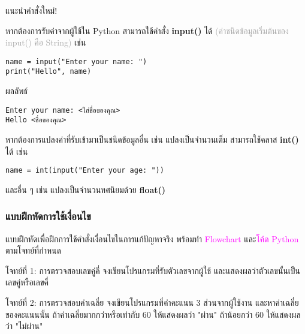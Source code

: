 \documentclass[12pt,a4paper]{article}
\newcommand{\textlight}[1]{{\thailightfont #1}}
\begin{document}
\begin{noticebox}{แนะนำคำสั่งใหม่!}

\textlight{หากต้องการรับค่าจากผู้ใช้ใน Python สามารถใช้คำสั่ง \textbf{input()} ได้ \textcolor{darkgray}{(ค่าชนิดข้อมูลเริ่มต้นของ input() คือ String)} เช่น}

\begin{codebox}{}
\begin{lstlisting}[style=python]
name = input("Enter your name: ")
print("Hello", name)
\end{lstlisting}
\end{codebox}

\begin{resultbox}{ผลลัพธ์}
\begin{verbatim}
Enter your name: <ใส่ชื่อของคุณ>
Hello <ชื่อของคุณ>
\end{verbatim}
\end{resultbox}

\textlight{หากต้องการแปลงค่าที่รับเข้ามาเป็นชนิดข้อมูลอื่น เช่น แปลงเป็นจำนวนเต็ม สามารถใช้คลาส \textbf{int()} ได้ เช่น}

\begin{codebox}{}
\begin{lstlisting}[style=python]
name = int(input("Enter your age: "))
\end{lstlisting}
\end{codebox}

\textlight{และอื่น ๆ เช่น แปลงเป็นจำนวนทศนิยมด้วย \textbf{float()}}

\end{noticebox}

\subsubsection{แบบฝึกหัดการใช้เงื่อนไข}

\textlight{แบบฝึกหัดเพื่อฝึกการใช้คำสั่งเงื่อนไขในการแก้ปัญหาจริง พร้อมทำ \textcolor{magenta}{Flowchart} และ\textcolor{magenta}{โค้ด Python} ตามโจทย์ที่กำหนด}

\begin{exercisebox}{โจทย์ที่ 1: การตรวจสอบเลขคู่คี่}
\textlight{จงเขียนโปรแกรมที่รับตัวเลขจากผู้ใช้ และแสดงผลว่าตัวเลขนั้นเป็นเลขคู่หรือเลขคี่}
\end{exercisebox}

\begin{exercisebox}{โจทย์ที่ 2: การตรวจสอบค่าเฉลี่ย}
\textlight{จงเขียนโปรแกรมที่ค่าคะแนน 3 ส่วนจากผู้ใช้งาน และหาค่าเฉลี่ยของคะแนนนั้น ถ้าค่าเฉลี่ยมากกว่าหรือเท่ากับ 60 ให้แสดงผลว่า "ผ่าน" ถ้าน้อยกว่า 60 ให้แสดงผลว่า "ไม่ผ่าน"}
\end{exercisebox}
\end{document}
